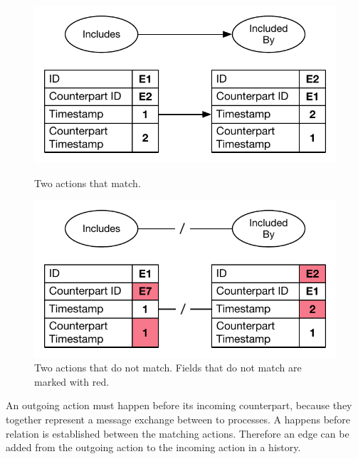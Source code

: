     \begin{figure}[H]
		\centering
		\begin{minipage}{0.45\textwidth}
			\centering
			\includegraphics[width=\textwidth]{4connect/images/actions-match.pdf}
		\caption{Two actions that match.}
		\label{fig:connect:actions-match}
		\end{minipage}\hfill
		\begin{minipage}{0.45\textwidth}
			\centering
			\includegraphics[width=\textwidth]{4connect/images/actions-do-not-match.pdf}
		\caption{Two actions that do not match. Fields that do not match are marked with red.}
		\label{fig:connect:actions-do-not-match}
		\end{minipage}
		\end{figure}
    \newpar An outgoing action must happen before its incoming counterpart, because they together represent a message exchange between to processes. A happens before relation is established between the matching actions. Therefore an edge can be added from the outgoing action to the incoming action in a history.

